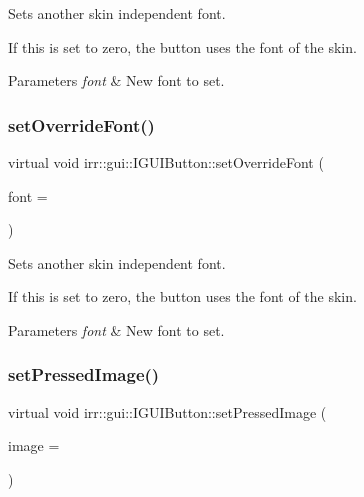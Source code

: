 Sets another skin independent font. 

If this is set to zero, the button uses the font of the skin. 
\begin{DoxyParams}{Parameters}
{\em font} & New font to set. \\
\hline
\end{DoxyParams}
\mbox{\label{classirr_1_1gui_1_1IGUIButton_ab63c3536bd2eb92e9ebec8ea3a381ec1}} 
\subsubsection{\texorpdfstring{set\+Override\+Font()}{setOverrideFont()}\hspace{0.1cm}{\footnotesize\ttfamily [2/2]}}
{\footnotesize\ttfamily virtual void irr\+::gui\+::\+I\+G\+U\+I\+Button\+::set\+Override\+Font (\begin{DoxyParamCaption}\item[{\hyperlink{classirr_1_1gui_1_1IGUIFont}{I\+G\+U\+I\+Font} $\ast$}]{font = {} }\end{DoxyParamCaption})\hspace{0.3cm}{\ttfamily [pure virtual]}}



Sets another skin independent font. 

If this is set to zero, the button uses the font of the skin. 
\begin{DoxyParams}{Parameters}
{\em font} & New font to set. \\
\hline
\end{DoxyParams}
\mbox{\label{classirr_1_1gui_1_1IGUIButton_a10389917530aa2f4a3008330c0695aad}} 
\subsubsection{\texorpdfstring{set\+Pressed\+Image()}{setPressedImage()}\hspace{0.1cm}{\footnotesize\ttfamily [1/4]}}
{\footnotesize\ttfamily virtual void irr\+::gui\+::\+I\+G\+U\+I\+Button\+::set\+Pressed\+Image (\begin{DoxyParamCaption}\item[{\hyperlink{classirr_1_1video_1_1ITexture}{video\+::\+I\+Texture} $\ast$}]{image = {} }\end{DoxyParamCaption})\hspace{0.3cm}{\ttfamily [pure virtual]}}



